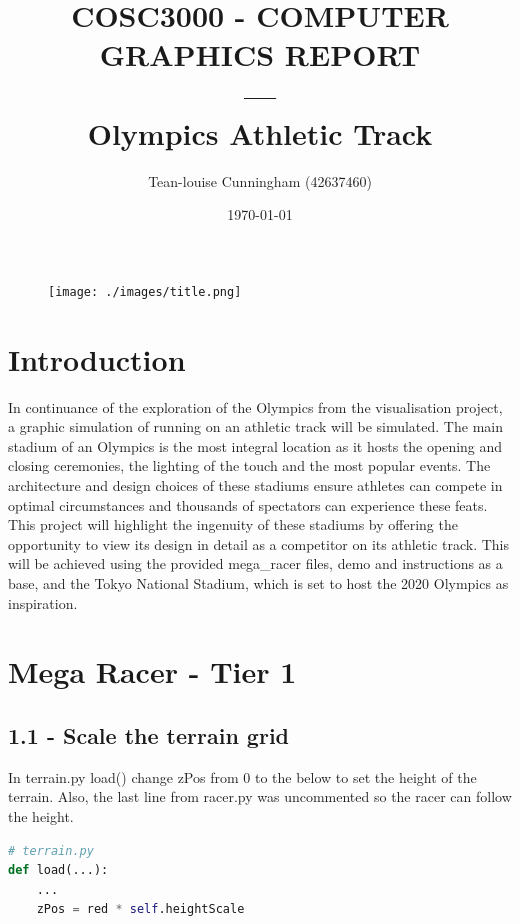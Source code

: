\documentclass[a4 paper, 12pt]{article}
\title{COSC3000 - COMPUTER GRAPHICS REPORT \\ --- \\Olympics Athletic Track}
\author{Tean-louise Cunningham (42637460)}
\date{\today}
\begin{document}
\maketitle
    \begin{figure} [H]
        \centering
        \texttt{[image: ./images/title.png]}                  
    \end{figure}  


\pagebreak
\tableofcontents
\pagebreak
\listoffigures

\pagebreak
\section{Introduction}
In continuance of the exploration of the Olympics from the visualisation project, a graphic simulation of running on an athletic track will be simulated. The main stadium of an Olympics is the most integral location as it hosts the opening and closing ceremonies, the lighting of the touch and the most popular events. The architecture and design choices of these stadiums ensure athletes can compete in optimal circumstances and thousands of spectators can experience these feats. This project will highlight the ingenuity of these stadiums by offering the opportunity to view its design in detail as a competitor on its athletic track. This will be achieved using the provided mega\_racer files, demo and instructions as a base, and the Tokyo National Stadium, which is set to host the 2020 Olympics as inspiration.

\section{Mega Racer - Tier 1}

\subsection{1.1 - Scale the terrain grid}
In terrain.py load() change zPos from 0 to the below to set the height of the terrain. Also, the last line from racer.py was uncommented so the racer can follow the height.   
    \begin{lstlisting}[language=python]
# terrain.py
def load(...):
    ...
    zPos = red * self.heightScale
    \end{lstlisting}
\end{document}
